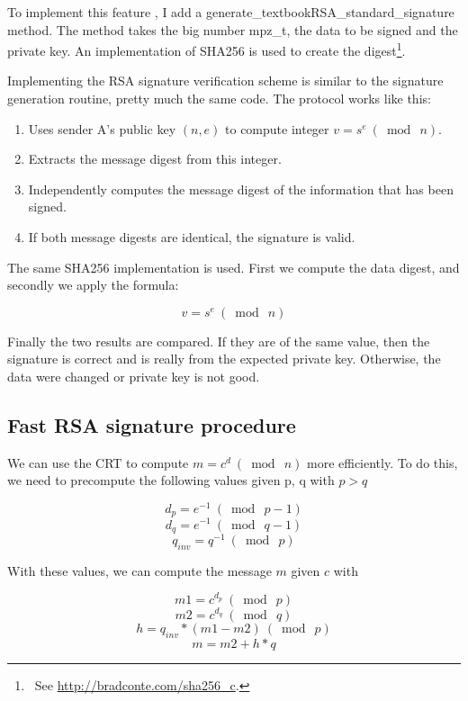 \documentclass[a4paper]{report}
\begin{document}
To implement this feature , I add a generate\_textbookRSA\_standard\_signature method. The method takes the big number mpz\_t, the data to be signed and the private key. An implementation of SHA256 is used to create the digest\footnote{\ See \href{http://bradconte.com/sha256\_c}{http://bradconte.com/sha256\_c}.}.


Implementing the RSA signature verification scheme is similar to the signature generation routine, pretty much the same code. The protocol works like this:
\begin{enumerate}
    \item Uses sender A's public key $(n, e)$ to compute integer $v = s^e  \ (\bmod{\ n} )$.
    \item Extracts the message digest from this integer.
    \item Independently computes the message digest of the information that has been signed.
    \item If both message digests are identical, the signature is valid.
\end{enumerate}

The same SHA256 implementation is used. First we compute the data digest, and secondly we apply the formula:

\[
v = s^e  \ (\bmod{\ n} )
\]

Finally the two results are compared. If they are of the same value, then the signature is correct and is really from the expected private key. Otherwise, the data were changed or private key is not good.


\newpage
\subsection{Fast RSA signature procedure}
We can use the CRT to compute $m = c^d\ (\bmod{\ n})$ more efficiently. To do this, we need to precompute the following values given p, q with $p > q$

\[
d_p = e^{-1} \ (\bmod{\ p - 1} )
\]
\[
d_q = e^{-1} \ (\bmod{\ q - 1} )
\]
\[
q_{inv} = q^{-1} \ ( \bmod{\ p} )
\]

With these values, we can compute the message $m$ given $c$ with

\[
m1 = c^{d_p}\ (\bmod\ p)
\]
\[
m2 = c^{d_q}\ (\bmod\ q)
\]
\[
h = q_{inv} * (m1 - m2)\ (\bmod\ p)
\]
\[
m = m2 + h*q 
\]
\end{document}
